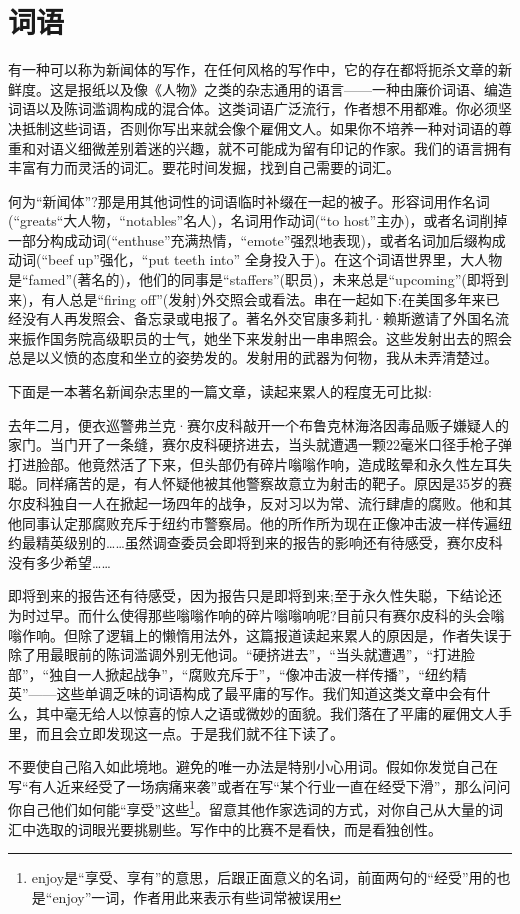 \chapter{词语}
有一种可以称为新闻体的写作，在任何风格的写作中，它的存在都将扼杀文章的新鲜度。这是报纸以及像《人物》之类的杂志通用的语言——一种由廉价词语、编造词语以及陈词滥调构成的混合体。这类词语广泛流行，作者想不用都难。你必须坚决抵制这些词语，否则你写出来就会像个雇佣文人。如果你不培养一种对词语的尊重和对语义细微差别着迷的兴趣，就不可能成为留有印记的作家。我们的语言拥有丰富有力而灵活的词汇。要花时间发掘，找到自己需要的词汇。

何为“新闻体”?那是用其他词性的词语临时补缀在一起的被子。形容词用作名词(“greats“大人物，“notables”名人)，名词用作动词(“to host”主办)，或者名词削掉一部分构成动词(“enthuse”充满热情，“emote”强烈地表现)，或者名词加后缀构成动词(“beef up”强化，“put teeth into” 全身投入于)。在这个词语世界里，大人物是“famed”(著名的)，他们的同事是“staffers”(职员)，未来总是“upcoming”(即将到来)，有人总是“firing off”(发射)外交照会或看法。串在一起如下:在美国多年来已经没有人再发照会、备忘录或电报了。著名外交官康多莉扎·赖斯邀请了外国名流来振作国务院高级职员的士气，她坐下来发射出一串串照会。这些发射出去的照会总是以义愤的态度和坐立的姿势发的。发射用的武器为何物，我从未弄清楚过。

下面是一本著名新闻杂志里的一篇文章，读起来累人的程度无可比拟:

去年二月，便衣巡警弗兰克·赛尔皮科敲开一个布鲁克林海洛因毒品贩子嫌疑人的家门。当门开了一条缝，赛尔皮科硬挤进去，当头就遭遇一颗22毫米口径手枪子弹打进脸部。他竟然活了下来，但头部仍有碎片嗡嗡作响，造成眩晕和永久性左耳失聪。同样痛苦的是，有人怀疑他被其他警察故意立为射击的靶子。原因是35岁的赛尔皮科独自一人在掀起一场四年的战争，反对习以为常、流行肆虐的腐败。他和其他同事认定那腐败充斥于纽约市警察局。他的所作所为现在正像冲击波一样传遍纽约最精英级别的……虽然调查委员会即将到来的报告的影响还有待感受，赛尔皮科没有多少希望……

即将到来的报告还有待感受，因为报告只是即将到来;至于永久性失聪，下结论还为时过早。而什么使得那些嗡嗡作响的碎片嗡嗡响呢?目前只有赛尔皮科的头会嗡嗡作响。但除了逻辑上的懒惰用法外，这篇报道读起来累人的原因是，作者失误于除了用最眼前的陈词滥调外别无他词。“硬挤进去”，“当头就遭遇”，“打进脸部”，“独自一人掀起战争”，“腐败充斥于”，“像冲击波一样传播”，“纽约精英”——这些单调乏味的词语构成了最平庸的写作。我们知道这类文章中会有什么，其中毫无给人以惊喜的惊人之语或微妙的面貌。我们落在了平庸的雇佣文人手里，而且会立即发现这一点。于是我们就不往下读了。

不要使自己陷入如此境地。避免的唯一办法是特别小心用词。假如你发觉自己在写“有人近来经受了一场病痛来袭”或者在写“某个行业一直在经受下滑”，那么问问你自己他们如何能“享受”这些\footnote{enjoy是“享受、享有”的意思，后跟正面意义的名词，前面两句的“经受”用的也是“enjoy”一词，作者用此来表示有些词常被误用}。留意其他作家选词的方式，对你自己从大量的词汇中选取的词眼光要挑剔些。写作中的比赛不是看快，而是看独创性。

